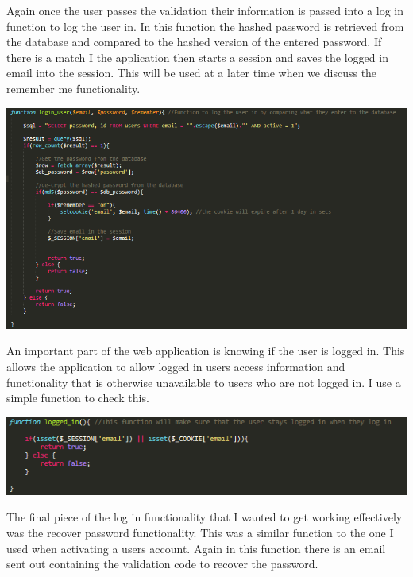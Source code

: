 Again once the user passes the validation their information is passed into a log in function to log the user in. In this function the hashed password is retrieved from the database and compared to the hashed version of the entered password. If there is a match I the application then starts a session and saves the logged in email into the session. This will be used at a later time when we discuss the remember me functionality.

\includegraphics[width=\textwidth,height=\textheight,keepaspectratio]{img/loginUser.png}

An important part of the web application is knowing if the user is logged in. This allows the application to allow logged in users access information and functionality that is otherwise unavailable to users who are not logged in. I use a simple function to check this.

\includegraphics[width=\textwidth,height=\textheight,keepaspectratio]{img/loggedIn.png}

The final piece of the log in functionality that I wanted to get working effectively was the recover password functionality. This was a similar function to the one I used when activating a users account. Again in this function there is an email sent out containing the validation code to recover the password.

